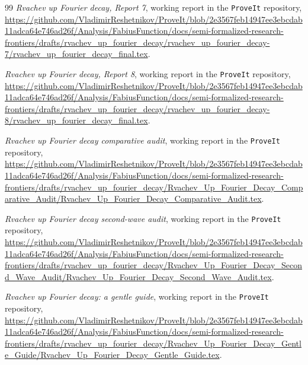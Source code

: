 \documentclass[11pt,oneside]{article}
\numberwithin{equation}{section}
\theoremstyle{definition}
\theoremstyle{remark}
\begin{document}
\begin{thebibliography}{99}
\emph{Rvachev up Fourier decay, Report 7}, working report in the
\texttt{ProveIt} repository,
\url{https://github.com/VladimirReshetnikov/ProveIt/blob/2e3567feb14947ee3ebcdab11adca64e746ad26f/Analysis/FabiusFunction/docs/semi-formalized-research-frontiers/drafts/rvachev_up_fourier_decay/rvachev_up_fourier_decay-7/rvachev_up_fourier_decay_final.tex}.

\emph{Rvachev up Fourier decay, Report 8}, working report in the
\texttt{ProveIt} repository,
\url{https://github.com/VladimirReshetnikov/ProveIt/blob/2e3567feb14947ee3ebcdab11adca64e746ad26f/Analysis/FabiusFunction/docs/semi-formalized-research-frontiers/drafts/rvachev_up_fourier_decay/rvachev_up_fourier_decay-8/rvachev_up_fourier_decay_final.tex}.

\emph{Rvachev up Fourier decay comparative audit}, working report in the
\texttt{ProveIt} repository,
\url{https://github.com/VladimirReshetnikov/ProveIt/blob/2e3567feb14947ee3ebcdab11adca64e746ad26f/Analysis/FabiusFunction/docs/semi-formalized-research-frontiers/drafts/rvachev_up_fourier_decay/Rvachev_Up_Fourier_Decay_Comparative_Audit/Rvachev_Up_Fourier_Decay_Comparative_Audit.tex}.

\emph{Rvachev up Fourier decay second-wave audit}, working report in the
\texttt{ProveIt} repository,
\url{https://github.com/VladimirReshetnikov/ProveIt/blob/2e3567feb14947ee3ebcdab11adca64e746ad26f/Analysis/FabiusFunction/docs/semi-formalized-research-frontiers/drafts/rvachev_up_fourier_decay/Rvachev_Up_Fourier_Decay_Second_Wave_Audit/Rvachev_Up_Fourier_Decay_Second_Wave_Audit.tex}.

\emph{Rvachev up Fourier decay: a gentle guide}, working report in the
\texttt{ProveIt} repository,
\url{https://github.com/VladimirReshetnikov/ProveIt/blob/2e3567feb14947ee3ebcdab11adca64e746ad26f/Analysis/FabiusFunction/docs/semi-formalized-research-frontiers/drafts/rvachev_up_fourier_decay/Rvachev_Up_Fourier_Decay_Gentle_Guide/Rvachev_Up_Fourier_Decay_Gentle_Guide.tex}.

\end{thebibliography}
\end{document}
